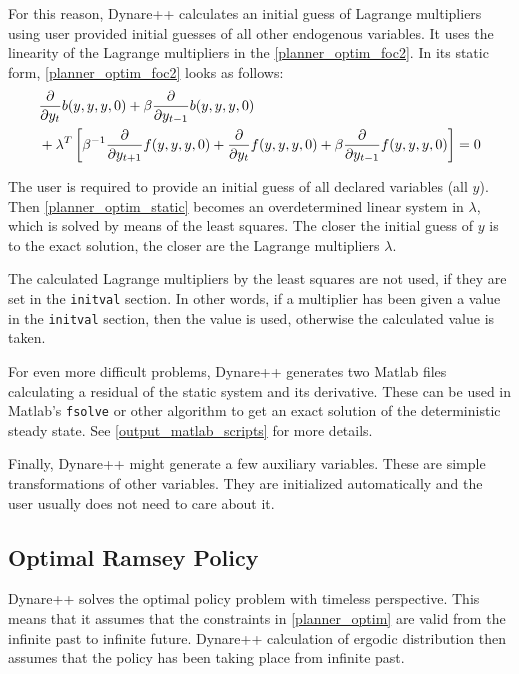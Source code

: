 \documentclass[10pt]{article}
\begin{document}
For this reason, Dynare++ calculates an initial guess of Lagrange
multipliers using user provided initial guesses of all other
endogenous variables. It uses the linearity of the Lagrange
multipliers in the \eqref{planner_optim_foc2}. In its static form,
\eqref{planner_optim_foc2} looks as follows:
\begin{align}
&\frac{\partial}{\partial y_t}b(y,y,y,0)+
\beta\frac{\partial}{\partial y_{t-1}}b(y,y,y,0)\notag\\
&+\lambda^T\left[\beta^{-1}\frac{\partial}{\partial y_{t+1}}f(y,y,y,0)
 +\frac{\partial}{\partial y_{t}}f(y,y,y,0)
 +\beta\frac{\partial}{\partial y_{t-1}}f(y,y,y,0)\right]
 = 0\label{planner_optim_static}
\end{align}

The user is required to provide an initial guess of all declared
variables (all $y$). Then \eqref{planner_optim_static} becomes an
overdetermined linear system in $\lambda$, which is solved by means of
the least squares. The closer the initial guess of $y$ is to the exact
solution, the closer are the Lagrange multipliers $\lambda$.

The calculated Lagrange multipliers by the least squares are not used,
if they are set in the {\tt initval} section. In other words, if a
multiplier has been given a value in the {\tt initval} section, then
the value is used, otherwise the calculated value is taken.

For even more difficult problems, Dynare++ generates two Matlab files
calculating a residual of the static system and its derivative. These
can be used in Matlab's {\tt fsolve} or other algorithm to get an
exact solution of the deterministic steady state. See
\ref{output_matlab_scripts} for more details.

Finally, Dynare++ might generate a few auxiliary variables. These are
simple transformations of other variables. They are initialized
automatically and the user usually does not need to care about it.

\subsection{Optimal Ramsey Policy}
\label{ramsey}

Dynare++ solves the optimal policy problem with timeless
perspective. This means that it assumes that the constraints in
\eqref{planner_optim} are valid from the infinite past to infinite
future. Dynare++ calculation of ergodic distribution then assumes that
the policy has been taking place from infinite past.
\end{document}
